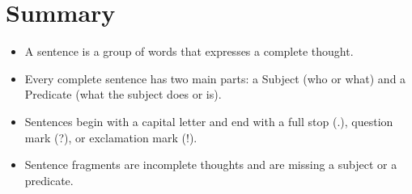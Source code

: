 \section{Summary}
\begin{summarybox}
    \begin{itemize}
        \item A sentence is a group of words that expresses a complete thought.
        \item Every complete sentence has two main parts: a Subject (who or what) and a Predicate (what the subject does or is).
        \item Sentences begin with a capital letter and end with a full stop (.), question mark (?), or exclamation mark (!).
        \item Sentence fragments are incomplete thoughts and are missing a subject or a predicate.
    \end{itemize}
\end{summarybox}